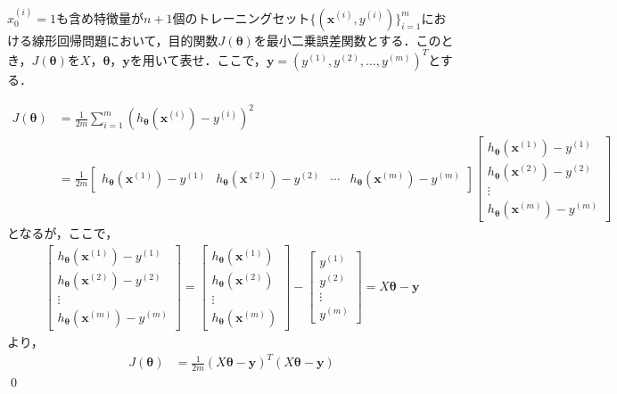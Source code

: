 \begin{qu}
$x_0^{(i)}=1$も含め特徴量が$n+1$個のトレーニングセット$\{({\bm x}^{(i)},y^{(i)})\}_{i=1}^m$における線形回帰問題において，目的関数$J({\bm \theta})$を最小二乗誤差関数とする．このとき，$J({\bm \theta})$を$X$，${\bm \theta}$，${\bm y}$を用いて表せ．ここで，${\bm y}=(y^{(1)},y^{(2)},\ldots,y^{(m)})^T$とする．
\end{qu}
\begin{ans}
\begin{align}
J({\bm \theta})&= \frac{1}{2m}\sum_{i=1}^m (h_{{\bm \theta}}({\bm x}^{(i)})-y^{(i)})^2 \nonumber \\
&=\frac{1}{2m}
\begin{bmatrix}
h_{{\bm \theta}}({\bm x}^{(1)})-y^{(1)} & h_{{\bm \theta}}({\bm x}^{(2)})-y^{(2)} & \cdots & h_{{\bm \theta}}({\bm x}^{(m)})-y^{(m)}
\end{bmatrix}
\begin{bmatrix}
h_{{\bm \theta}}({\bm x}^{(1)})-y^{(1)} \\
h_{{\bm \theta}}({\bm x}^{(2)})-y^{(2)} \\
\vdots \\
h_{{\bm \theta}}({\bm x}^{(m)})-y^{(m)}
\end{bmatrix}\nonumber
\end{align}
となるが，ここで，
\begin{align}
\begin{bmatrix}
h_{{\bm \theta}}({\bm x}^{(1)})-y^{(1)} \\
h_{{\bm \theta}}({\bm x}^{(2)})-y^{(2)} \\
\vdots \\
h_{{\bm \theta}}({\bm x}^{(m)})-y^{(m)}
\end{bmatrix}
=
\begin{bmatrix}
h_{{\bm \theta}}({\bm x}^{(1)}) \\
h_{{\bm \theta}}({\bm x}^{(2)}) \\
\vdots \\
h_{{\bm \theta}}({\bm x}^{(m)})
\end{bmatrix}
-
\begin{bmatrix}
y^{(1)} \\
y^{(2)} \\
\vdots \\
y^{(m)}
\end{bmatrix}
=X{\bm \theta}-{\bm y} \nonumber
\end{align}
より，
\begin{align}
J({\bm \theta})&= \frac{1}{2m}(X{\bm \theta}-{\bm y})^T(X{\bm \theta}-{\bm y}) \label{lr_cost}
\end{align}\qed
\end{ans}

